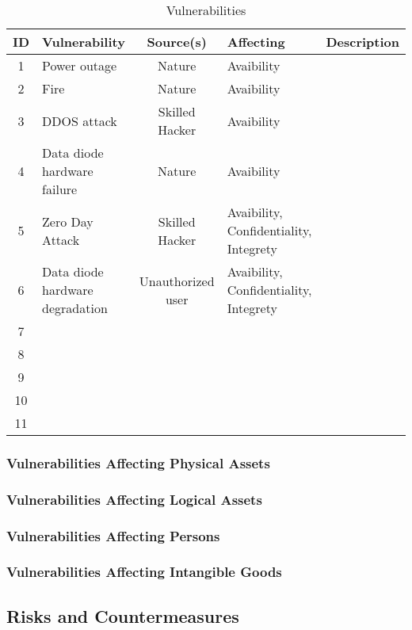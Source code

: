 \documentclass[a4paper,10pt]{article}
\begin{document}
\begin{table}[!h]
	\centering
	\begin{tabular}{|c|p{2.5cm}|c|p{2.5cm}|p{6.5cm}|}
		\hline
		\textbf{ID}&  \textbf{Vulnerability} & \textbf{Source(s)} & \textbf{Affecting} & \textbf{Description} \\
		\hline
		1 & Power outage & Nature & Avaibility &  \\
		\hline
		2 & Fire & Nature & Avaibility &  \\
		\hline
		3 & DDOS attack & Skilled Hacker & Avaibility &  \\
		\hline
		4 & Data diode hardware
		failure & Nature & Avaibility & \\
		\hline
		5 & Zero Day Attack & Skilled Hacker & Avaibility, Confidentiality, Integrety & \\
		\hline
		6 & Data diode hardware degradation & Unauthorized user & Avaibility, Confidentiality, Integrety & \\
		\hline
		7 &  &  &  & \\
		\hline
		8 &  &  &  & \\
		\hline
		9 &  &  &  & \\
		\hline
		10 &  &  &  & \\
		\hline
		11 &  &  &  & \\
		\hline
	\end{tabular}
	\caption{Vulnerabilities}
\end{table}

\subsubsection{Vulnerabilities Affecting Physical Assets}
\subsubsection{Vulnerabilities Affecting Logical Assets}
\subsubsection{Vulnerabilities Affecting Persons}
\subsubsection{Vulnerabilities Affecting Intangible Goods}

\subsection{Risks and Countermeasures}
\end{document}
